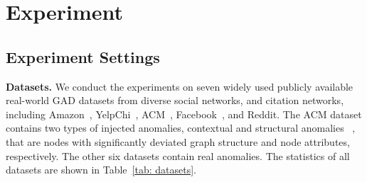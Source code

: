 \documentclass{article}
\begin{document}
\section{Experiment}
\subsection{Experiment Settings}
\noindent\textbf{Datasets.}
 We conduct the experiments on seven widely used publicly available real-world GAD datasets from diverse social networks, and citation networks, including Amazon~\cite{dou2020enhancing}, YelpChi~\cite{kumar2019predicting}, ACM~\cite{tang2008arnetminer}, Facebook~\cite{xu2022contrastive}, and Reddit. The ACM dataset contains two types of injected anomalies, contextual and structural anomalies ~\cite{Cola_liu2021anomaly,dominant_ding2019deep}, that are nodes with significantly deviated graph structure and node attributes, respectively. The other six datasets contain real anomalies. The statistics of all datasets are shown in Table~\ref{tab: datasets}. 



 

\begin{table}[ht!]
\setlength{\tabcolsep}{0.65mm}
\centering
{}
\caption{The statistics of seven datasets. The R/I represents the datasets with Injected/Real anomalies.}
\label{tab: datasets}
\end{table}
\end{document}
